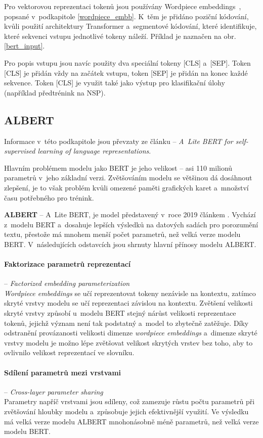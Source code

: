 Pro vektorovou reprezentaci tokenů jsou používány Wordpiece embeddings~\cite{wordpiece}, popsané v~podkapitole \ref{wordpiece_embb}. K~těm je přidáno poziční kódování, kvůli použití architektury Transformer a~segmentové kódování, které identifikuje, které sekvenci vstupu jednotlivé tokeny náleží. Příklad je naznačen na obr. \ref{bert_input}.\par
Pro popis vstupu jsou navíc použity dva speciální tokeny [CLS] a~[SEP]. Token [CLS] je přidán vždy na začátek vstupu, token [SEP] je přidán na konec každé sekvence. Token [CLS] je využit také jako výstup pro klasifikační úlohy (například předtrénink na NSP).

\subsection{ALBERT}
Informace v~této podkapitole jsou převzaty ze článku \cite{ALBERT} -- \emph{A~Lite BERT for self-supervised learning of language representations}.\par
Hlavním problémem modelu jako BERT je jeho velikost -- asi 110 milionů parametrů v~jeho základní verzi. Zvětšováním modelu se většinou dá dosáhnout zlepšení, je to však problém kvůli omezené paměti grafických karet a~množství času potřebného pro trénink.\par
\textbf{ALBERT} -- A~Lite BERT, je model představený v~roce 2019 článkem \cite{ALBERT}. Vychází z~modelu BERT a~dosahuje lepších výsledků na datových sadách pro porozumění textu, přestože má mnohem menší počet parametrů, než velká verze modelu BERT. V~následujících odstavcích jsou shrnuty hlavní přínosy modelu ALBERT.

\paragraph{Faktorizace parametrů reprezentací} -- \emph{Factorized embedding parameterization}\\ 
\emph{Wordpiece embeddings} se učí reprezentovat tokeny nezávisle na kontextu, zatímco skryté vrstvy modelu se učí reprezentaci závislou na kontextu. Zvětšení velikosti skryté vrstvy způsobí u~modelu BERT stejný nárůst velikosti reprezentace tokenů, jejichž význam není tak podstatný a~model to zbytečně zatěžuje.
Díky odstranění provázanosti velikosti dimenze \emph{wordpiece embeddings} a~dimenze skryté vrstvy modelu je možno lépe zvětšovat velikost skrytých vrstev bez toho, aby to ovlivnilo velikost reprezentací ve slovníku.

\paragraph{Sdílení parametrů mezi vrstvami} -- \textit{Cross-layer parameter sharing}\\
Parametry napříč vrstvami jsou sdíleny, což zamezuje růstu počtu parametrů při zvětšování hloubky modelu a~způsobuje jejich efektivnější využití. Ve výsledku má velká verze modelu ALBERT mnohonásobně méně parametrů, než velká verze modelu BERT.

